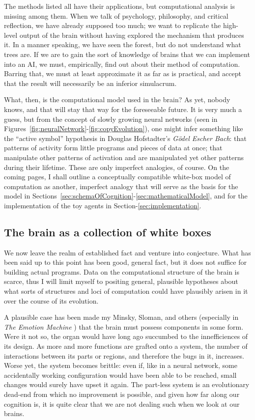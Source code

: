 The methods listed all have their applications, but computational analysis is missing among them. When we talk of psychology, philosophy, and critical reflection, we have already supposed too much; we want to replicate the high-level output of the brain without having explored the mechanism that produces it. In a manner speaking, we have seen the forest, but do not understand what trees are. If we are to gain the sort of knowledge of brains that we can implement into an AI, we must, empirically, find out about their method of computation. Barring that, we must at least approximate it as far as is practical, and accept that the result will necessarily be an inferior simulacrum.

What, then, is the computational model used in the brain? As yet, nobody knows, and that will stay that way for the foreseeable future. It is very much a guess, but from the concept of slowly growing neural networks (seen in Figures~\ref{fig:neuralNetwork}-\ref{fig:copyEvolution}), one might infer something like the ``active symbol'' hypothesis in Douglas Hofstadter's {\em G\"{o}del Escher Bach}: that patterns of activity form little programs and pieces of data at once; that manipulate other patterns of activation and are manipulated yet other patterns during their lifetime. These are only imperfect analogies, of course. On the coming pages, I shall outline a conceptually compatible white-box model of computation as another, imperfect analogy that will serve as the basis for the model in Sections~\ref{sec:schemaOfCognition}-\ref{sec:mathematicalModel}, and for the implementation of the toy agents in Section-\ref{sec:implementation}.

\subsection{The brain as a collection of white boxes}

We now leave the realm of established fact and venture into conjecture. What has been said up to this point has been good, general fact, but it does not suffice for building actual programs. Data on the computational structure of the brain is scarce, thus I will limit myself to positing general, plausible hypotheses about what sorts of structures and loci of computation could have plausibly arisen in it over the course of its evolution. 

A plausible case has been made my Minsky, Sloman, and others (especially in {\em The Emotion Machine} \cite{emotionMachine}) that the brain must possess components in some form. Were it not so, the organ would have long ago succumbed to the innefficiences of its design. As more and more functions are grafted onto a system, the number of interactions between its parts or regions, and therefore the bugs in it, increases. Worse yet, the system becomes brittle: even if, like in a neural network, some accidentally working configuration would have been able to be reached, small changes would surely have upset it again. The part-less system is an evolutionary dead-end from which no improvement is possible, and given how far along our cognition is, it is quite clear that we are not dealing such when we look at our brains.

